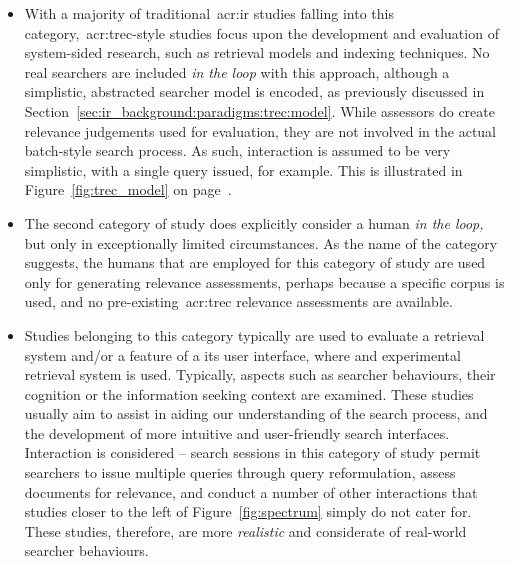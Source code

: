 \begin{itemize}
        \item[]{\hspace{-6mm} With a majority of traditional~\gls{acr:ir} studies falling into this category,~\gls{acr:trec}-style studies focus upon the development and evaluation of system-sided research, such as retrieval models and indexing techniques. No real searchers are included \emph{in the loop} with this approach, although a simplistic, abstracted searcher model is encoded, as previously discussed in Section~\ref{sec:ir_background:paradigms:trec:model}. While assessors do create relevance judgements used for evaluation, they are not involved in the actual batch-style search process. As such, interaction is assumed to be very simplistic, with a single query issued, for example. This is illustrated in Figure~\ref{fig:trec_model} on page~\pageref{fig:trec_model}.}
    \item[]{\hspace{-6mm} The second category of study does explicitly consider a human \emph{in the loop,} but only in exceptionally limited circumstances. As the name of the category suggests, the humans that are employed for this category of study are used only for generating relevance assessments, perhaps because a specific corpus is used, and no pre-existing~\gls{acr:trec} relevance assessments are available.}
    \item[]{\hspace{-6mm}  Studies belonging to this category typically are used to evaluate a retrieval system and/or a feature of a its user interface, where and experimental retrieval system is used. Typically, aspects such as searcher behaviours, their cognition or the information seeking context are examined. These studies usually aim to assist in aiding our understanding of the search process, and the development of more intuitive and user-friendly search interfaces. Interaction is considered -- search sessions in this category of study permit searchers to issue multiple queries through query reformulation, assess documents for relevance, and conduct a number of other interactions that studies closer to the left of Figure~\ref{fig:spectrum} simply do not cater for. These studies, therefore, are more \emph{realistic} and considerate of real-world searcher behaviours.}
    

\end{itemize}
